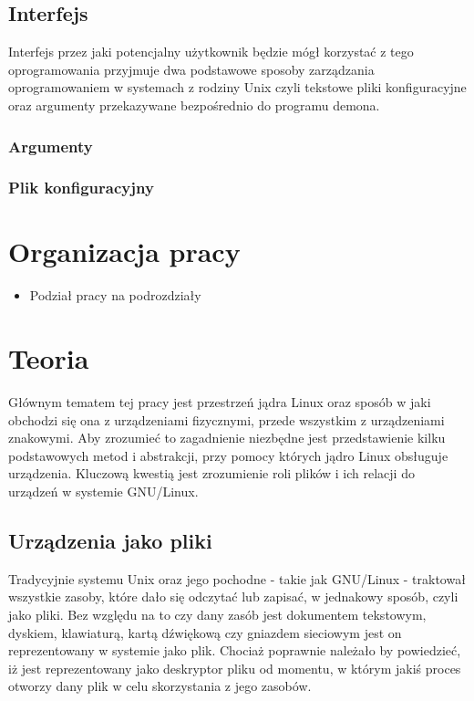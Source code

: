 \subsection{Interfejs}

Interfejs przez jaki potencjalny użytkownik będzie mógł korzystać z tego
oprogramowania przyjmuje dwa podstawowe sposoby zarządzania
oprogramowaniem w systemach z rodziny Unix czyli tekstowe pliki
konfiguracyjne oraz argumenty przekazywane bezpośrednio do programu
demona.

\subsubsection{Argumenty}

\subsubsection{Plik konfiguracyjny}

\section{Organizacja pracy}

\begin{itemize}
\itemsep1pt\parskip0pt
\item
  Podział pracy na podrozdziały
\end{itemize}

\section{Teoria}

Głównym tematem tej pracy jest przestrzeń jądra Linux oraz sposób w jaki
obchodzi się ona z urządzeniami fizycznymi, przede wszystkim z
urządzeniami znakowymi. Aby zrozumieć to zagadnienie niezbędne jest
przedstawienie kilku podstawowych metod i abstrakcji, przy pomocy
których jądro Linux obsługuje urządzenia. Kluczową kwestią jest
zrozumienie roli plików i ich relacji do urządzeń w systemie GNU/Linux.

\subsection{Urządzenia jako pliki}

Tradycyjnie systemu Unix oraz jego pochodne - takie jak GNU/Linux -
traktował wszystkie zasoby, które dało się odczytać lub zapisać, w
jednakowy sposób, czyli jako pliki. Bez względu na to czy dany zasób
jest dokumentem tekstowym, dyskiem, klawiaturą, kartą dźwiękową czy
gniazdem sieciowym jest on reprezentowany w systemie jako plik. Chociaż
poprawnie należało by powiedzieć, iż jest reprezentowany jako deskryptor
pliku od momentu, w którym jakiś proces otworzy dany plik w celu
skorzystania z jego zasobów.

